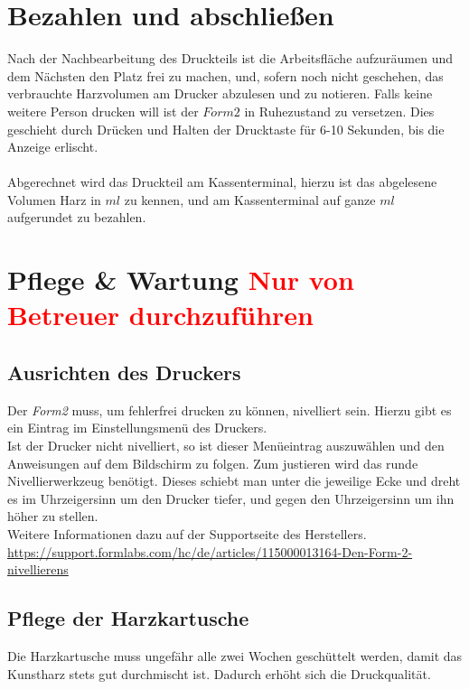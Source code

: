 \documentclass{\basedir/fablab-document}
\begin{document}
	
	\section{Bezahlen und abschließen}
	
	Nach der Nachbearbeitung des Druckteils ist die Arbeitsfläche aufzuräumen und dem Nächsten den Platz frei zu machen, und, sofern noch nicht geschehen, das verbrauchte Harzvolumen am Drucker abzulesen und zu notieren. Falls keine weitere Person drucken will ist der $Form2$ in Ruhezustand zu versetzen. Dies geschieht durch Drücken und Halten der Drucktaste für 6-10 Sekunden, bis die Anzeige erlischt. \\ 
	\\
	Abgerechnet wird das Druckteil am Kassenterminal, hierzu ist das abgelesene Volumen Harz in $ml$ zu kennen, und am Kassenterminal auf ganze $ml$ aufgerundet zu bezahlen.
	\pagebreak
	

	\section{Pflege \& Wartung \textcolor{red}{Nur von Betreuer durchzuführen}}
	
	\subsection{Ausrichten des Druckers}
	Der \textit{Form2} muss, um fehlerfrei drucken zu können, nivelliert sein. Hierzu gibt es ein Eintrag im Einstellungsmenü des Druckers.\\
	Ist der Drucker nicht nivelliert, so ist dieser Menüeintrag auszuwählen und den Anweisungen auf dem Bildschirm zu folgen. Zum justieren wird das runde Nivellierwerkzeug benötigt. Dieses schiebt man unter die jeweilige Ecke und dreht es im Uhrzeigersinn um den Drucker tiefer, und gegen den Uhrzeigersinn um ihn höher zu stellen.\\
	Weitere Informationen dazu auf der Supportseite des Herstellers.	\\
	 \url{https://support.formlabs.com/hc/de/articles/115000013164-Den-Form-2-nivellierens}
	 
	 \subsection{Pflege der Harzkartusche}
	 Die Harzkartusche muss ungefähr alle zwei Wochen geschüttelt werden, damit das Kunstharz stets gut durchmischt ist. Dadurch erhöht sich die Druckqualität.
	
\end{document}
